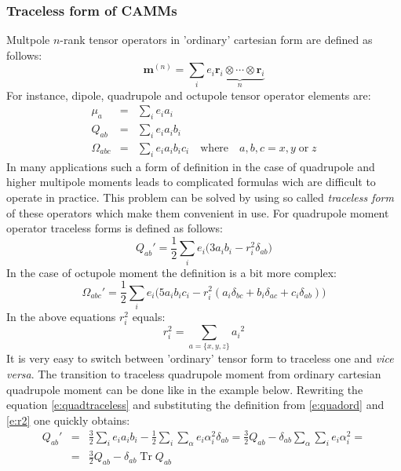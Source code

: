 \documentclass[a4paper,titlepage,twoside,fleqn]{article}
\begin{document}
\subsubsection*{Traceless form of CAMMs}
Multpole $n$-rank tensor operators in 'ordinary' 
cartesian form are defined as follows:
\begin{equation}
{\mathbf m}^{(n)} = \sum_i e_i \underbrace{{\mathbf r}_i \otimes \cdots \otimes {\mathbf r}_i}_{n}
\end{equation}
For instance, dipole, quadrupole and octupole tensor 
operator elements are:
\begin{eqnarray}\label{e:quadord}
\mu_a         &=& \sum_i e_i a_i \\
 Q_{ab}       &=& \sum_i e_i a_i b_i \\
\Omega_{abc}  &=& \sum_i e_i a_i b_i c_i \quad  \textrm{where} \quad a,b,c=x,y \; \textrm{or} \; z
\end{eqnarray}
In many applications such a form of definition in the case
of quadrupole and higher multipole moments leads
to complicated formulas wich are difficult to operate
in practice. This problem can be solved by using so called
\emph{traceless form} of these operators which make them 
convenient in use. For quadrupole 
moment operator traceless forms is defined as follows:
\begin{equation}\label{e:quadtraceless}
Q_{ab}' = \frac{1}{2}\sum_i e_i \big( 3a_ib_i-r_i^2\delta_{ab}\big)
\end{equation}
In the case of octupole moment the definition is a bit more 
complex:
\begin{equation}
\Omega_{abc}' = \frac{1}{2}\sum_i e_i \big( 5a_ib_ic_i-r_i^2(a_i\delta_{bc}+
                                                                     b_i\delta_{ac}+
                                                                     c_i\delta_{ab})\big)
\end{equation}
In the above equations $r_i^2$ equals:
\begin{equation}\label{e:r2}
r_i^2 = \sum_{a=\{x,y,z\}} {a_i}^2  
\end{equation}
It is very easy to switch between 'ordinary' tensor form to 
traceless one and \emph{vice versa}. The transition to traceless
quadrupole moment from ordinary cartesian quadrupole moment 
can be done like in the example below. Rewriting the equation
\ref{e:quadtraceless} and substituting the definition from 
\ref{e:quadord} and \ref{e:r2} one quickly obtains:
\begin{eqnarray}
Q_{ab}' &=& \frac{3}{2}\sum_i e_ia_ib_i - \frac{1}{2}\sum_i\sum_{\alpha}e_i\alpha_i^2\delta_{ab} 
= \frac{3}{2}Q_{ab} -\delta_{ab}\sum_{\alpha}\sum_ie_i\alpha_i^2 =\\ \nonumber 
&=& \frac{3}{2}Q_{ab} - \delta_{ab}\;\mathrm{Tr}\;Q_{ab} 
\end{eqnarray}
\end{document}
